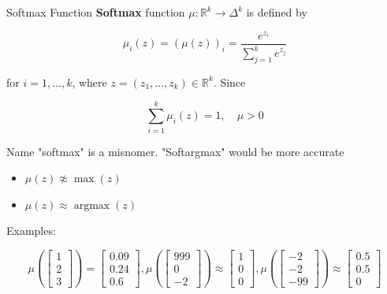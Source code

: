 \begin{frame}[allowframebreaks]

\begin{mydefinitionblock}{4.7}{Softmax Function}
    \textbf{Softmax} function $\mu: \mathbb{R}^{k} \rightarrow \Delta^{k}$ is defined by

    $$
    \mu_{i}(z)=(\mu(z))_{i}=\frac{e^{z_{i}}}{\sum_{j=1}^{k} e^{z_{j}}}
    $$

    for $i=1, \ldots, k$, where $z=\left(z_{1}, \ldots, z_{k}\right) \in \mathbb{R}^{k}$. Since

    $$
    \sum_{i=1}^{k} \mu_{i}(z)=1, \quad \mu>0
    $$

    Name "softmax" is a misnomer. "Softargmax" would be more accurate

    \begin{itemize}
        \item $\mu(z) \not \approx \max (z)$
        \item $\mu(z) \approx \operatorname{argmax}(z)$
    \end{itemize}

    Examples:

    $$
    \mu\left(\left[\begin{array}{l}
    1 \\
    2 \\
    3
    \end{array}\right]\right)=\left[\begin{array}{l}
    0.09 \\
    0.24 \\
    0.6
    \end{array}\right],
    \mu\left(\left[\begin{array}{c}
    999 \\
    0 \\
    -2
    \end{array}\right]\right) \approx\left[\begin{array}{l}
    1 \\
    0 \\
    0
    \end{array}\right],
    \mu\left(\left[\begin{array}{c}
    -2 \\
    -2 \\
    -99
    \end{array}\right]\right) \approx\left[\begin{array}{c}
    0.5 \\
    0.5 \\
    0
    \end{array}\right]
    $$
\end{mydefinitionblock}

\end{frame}

